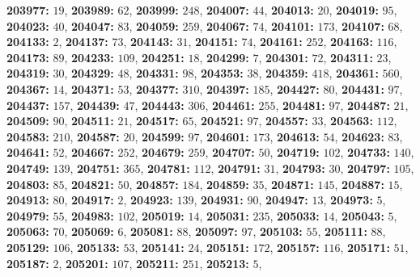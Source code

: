 \textsf{\bfseries 203977:} $19$, \textsf{\bfseries 203989:} $62$, \textsf{\bfseries 203999:} $248$, \textsf{\bfseries 204007:} $44$, \textsf{\bfseries 204013:} $20$, \textsf{\bfseries 204019:} $95$, \textsf{\bfseries 204023:} $40$, \textsf{\bfseries 204047:} $83$, \textsf{\bfseries 204059:} $259$, \textsf{\bfseries 204067:} $74$, \textsf{\bfseries 204101:} $173$, \textsf{\bfseries 204107:} $68$, \textsf{\bfseries 204133:} $2$, \textsf{\bfseries 204137:} $73$, \textsf{\bfseries 204143:} $31$, \textsf{\bfseries 204151:} $74$, \textsf{\bfseries 204161:} $252$, \textsf{\bfseries 204163:} $116$, \textsf{\bfseries 204173:} $89$, \textsf{\bfseries 204233:} $109$, \textsf{\bfseries 204251:} $18$, \textsf{\bfseries 204299:} $7$, \textsf{\bfseries 204301:} $72$, \textsf{\bfseries 204311:} $23$, \textsf{\bfseries 204319:} $30$, \textsf{\bfseries 204329:} $48$, \textsf{\bfseries 204331:} $98$, \textsf{\bfseries 204353:} $38$, \textsf{\bfseries 204359:} $418$, \textsf{\bfseries 204361:} $560$, \textsf{\bfseries 204367:} $14$, \textsf{\bfseries 204371:} $53$, \textsf{\bfseries 204377:} $310$, \textsf{\bfseries 204397:} $185$, \textsf{\bfseries 204427:} $80$, \textsf{\bfseries 204431:} $97$, \textsf{\bfseries 204437:} $157$, \textsf{\bfseries 204439:} $47$, \textsf{\bfseries 204443:} $306$, \textsf{\bfseries 204461:} $255$, \textsf{\bfseries 204481:} $97$, \textsf{\bfseries 204487:} $21$, \textsf{\bfseries 204509:} $90$, \textsf{\bfseries 204511:} $21$, \textsf{\bfseries 204517:} $65$, \textsf{\bfseries 204521:} $97$, \textsf{\bfseries 204557:} $33$, \textsf{\bfseries 204563:} $112$, \textsf{\bfseries 204583:} $210$, \textsf{\bfseries 204587:} $20$, \textsf{\bfseries 204599:} $97$, \textsf{\bfseries 204601:} $173$, \textsf{\bfseries 204613:} $54$, \textsf{\bfseries 204623:} $83$, \textsf{\bfseries 204641:} $52$, \textsf{\bfseries 204667:} $252$, \textsf{\bfseries 204679:} $259$, \textsf{\bfseries 204707:} $50$, \textsf{\bfseries 204719:} $102$, \textsf{\bfseries 204733:} $140$, \textsf{\bfseries 204749:} $139$, \textsf{\bfseries 204751:} $365$, \textsf{\bfseries 204781:} $112$, \textsf{\bfseries 204791:} $31$, \textsf{\bfseries 204793:} $30$, \textsf{\bfseries 204797:} $105$, \textsf{\bfseries 204803:} $85$, \textsf{\bfseries 204821:} $50$, \textsf{\bfseries 204857:} $184$, \textsf{\bfseries 204859:} $35$, \textsf{\bfseries 204871:} $145$, \textsf{\bfseries 204887:} $15$, \textsf{\bfseries 204913:} $80$, \textsf{\bfseries 204917:} $2$, \textsf{\bfseries 204923:} $139$, \textsf{\bfseries 204931:} $90$, \textsf{\bfseries 204947:} $13$, \textsf{\bfseries 204973:} $5$, \textsf{\bfseries 204979:} $55$, \textsf{\bfseries 204983:} $102$, \textsf{\bfseries 205019:} $14$, \textsf{\bfseries 205031:} $235$, \textsf{\bfseries 205033:} $14$, \textsf{\bfseries 205043:} $5$, \textsf{\bfseries 205063:} $70$, \textsf{\bfseries 205069:} $6$, \textsf{\bfseries 205081:} $88$, \textsf{\bfseries 205097:} $97$, \textsf{\bfseries 205103:} $55$, \textsf{\bfseries 205111:} $88$, \textsf{\bfseries 205129:} $106$, \textsf{\bfseries 205133:} $53$, \textsf{\bfseries 205141:} $24$, \textsf{\bfseries 205151:} $172$, \textsf{\bfseries 205157:} $116$, \textsf{\bfseries 205171:} $51$, \textsf{\bfseries 205187:} $2$, \textsf{\bfseries 205201:} $107$, \textsf{\bfseries 205211:} $251$, \textsf{\bfseries 205213:} $5$, 
